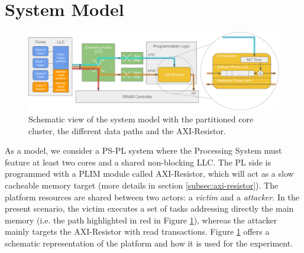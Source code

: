\section{System Model}
    \label{sec:system_model}
    \begin{figure}
        \centering
        \includegraphics[scale=0.56]{images/Evaluation_setup.pdf}
        \caption{Schematic view of the system model with the partitioned core cluster, the different data paths and the AXI-Resistor.}
        \label{fig:system_schematic}
    \end{figure}

    As a model, we consider a PS-PL system where the Processing System must feature at least two cores and a shared non-blocking LLC.
    The PL side is programmed with a PLIM module called AXI-Resistor, which will act as a slow cacheable memory target (more details in section \ref{subsec:axi-resistor}).
    The platform resources are shared between two actors: a \emph{victim} and a \emph{attacker}.
    In the present scenario, the victim executes a set of tasks addressing directly the main memory (i.e. the path highlighted in red in Figure \ref{fig:system_schematic}), whereas the attacker mainly targets the AXI-Resistor with read transactions.
    Figure \ref{fig:system_schematic} offers a schematic representation of the platform and how it is used for the experiment.



